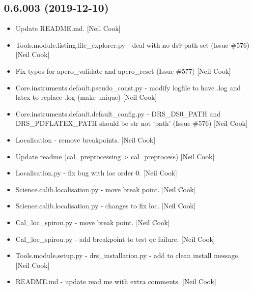\documentclass[a4paper,10pt,english]{report}
\begin{document}
\subsection{0.6.003 (2019-12-10)}
\label{\detokenize{misc/changelog:id14}}\begin{itemize}
\item {} 
Update README.md. {[}Neil Cook{]}

\item {} 
Tools.module.listing.file\_explorer.py - deal with no ds9 path set
(Issue \#576) {[}Neil Cook{]}

\item {} 
Fix typos for apero\_validate and apero\_reset (Issue \#577) {[}Neil Cook{]}

\item {} 
Core.instruments.default.pseudo\_const.py - modify logfile to have .log
and latex to replace .log (make unique) {[}Neil Cook{]}

\item {} 
Core.instruments.default.default\_config.py - DRS\_DS0\_PATH and
DRS\_PDFLATEX\_PATH should be str not ‘path’ (Issue \#576) {[}Neil Cook{]}

\item {} 
Localisation - remove breakpoints. {[}Neil Cook{]}

\item {} 
Update readme (cal\_preprocessing \textendash{}\textgreater{} cal\_preprocess) {[}Neil Cook{]}

\item {} 
Localisation.py - fix bug with loc order 0. {[}Neil Cook{]}

\item {} 
Science.calib.localisation.py - move break point. {[}Neil Cook{]}

\item {} 
Science.calib.localisation.py - changes to fix loc. {[}Neil Cook{]}

\item {} 
Cal\_loc\_spirou.py - move break point. {[}Neil Cook{]}

\item {} 
Cal\_loc\_spirou.py - add breakpoint to test qc failure. {[}Neil Cook{]}

\item {} 
Tools.module.setup.py - drs\_installation.py - add to clean install
message. {[}Neil Cook{]}

\item {} 
README.md - update read me with extra comments. {[}Neil Cook{]}


\end{itemize}
\end{document}
